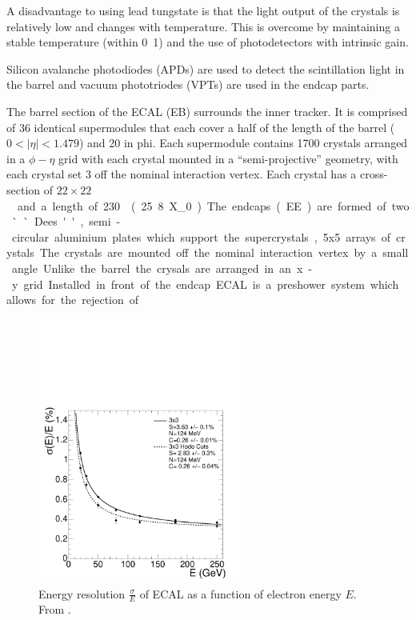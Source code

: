 A disadvantage to using lead tungstate is that the light output of the crystals
is relatively low and changes with temperature. This is overcome by maintaining
a stable temperature (within \unit{0.1}{\degreecelsius}) and the use of
photodetectors with intrinsic gain.

Silicon avalanche photodiodes (APDs) are used to detect the scintillation light
in the barrel and vacuum phototriodes (VPTs) are used in the endcap parts.

The barrel section of the ECAL (EB) surrounds the inner tracker. It is comprised
of 36 identical supermodules that each cover a half of the length of the barrel
($0<|\eta|<1.479$) and \unit{20}{\degree} in phi. Each supermodule contains
1700 crystals arranged in a $\phi - \eta$ grid with each crystal mounted in a
``semi-projective'' geometry, with each crystal set \unit{3}{\degree} off the
nominal interaction vertex. Each crystal has a cross-section of
\unit{$22 \times 22$}{\mm\squared} and a length of
\unit{230}{\mm}(\unit{25.8}{X_0}).

The endcaps (EE) are formed of two ``Dees'', semi-circular aluminium plates
which support the supercrystals, 5x5 arrays of crystals. The crystals are
mounted off the nominal interaction vertex by a small angle. Unlike the barrel
the crysals are arranged in an x-y grid.
Installed in front of the endcap ECAL is a preshower system which allows for
the rejection of \Ppizero .\cite{cms}

\begin{figure}[htb!]
  \centering
  \includegraphics[width=0.6\textwidth]{ecal_performance}
  \caption{Energy resolution $\frac{\sigma}{E}$ of ECAL as a function of
  \label{fig:ECAL}
electron energy $E$. From \cite{cms}.}
\end{figure}

